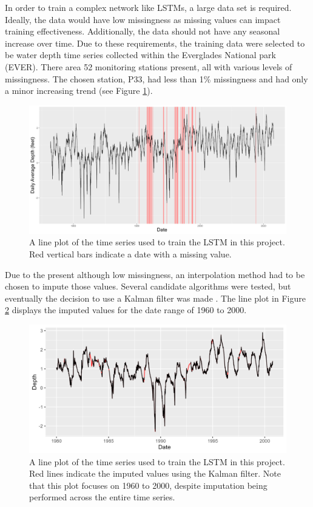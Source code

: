 In order to train a complex network like LSTMs, a large data set is required. Ideally, the data would have low missingness as missing values can impact training effectiveness. Additionally, the data should not have any seasonal increase over time. Due to these requirements, the training data were selected to be water depth time series collected within the Everglades National park (EVER). There area 52 monitoring stations present, all with various levels of missingness. The chosen station, P33, had less than 1\% missingness and had only a minor increasing trend (see Figure \ref{fig:P33}).

\begin{figure}[ht]
    \centering
    \includegraphics[width=0.75\linewidth]{"Figures/P33_Time_Series_Missingness.png"}
    \caption{A line plot of the time series used to train the LSTM in this project. Red vertical bars indicate a date with a missing value.}
    \label{fig:P33}
\end{figure}

Due to the present although low missingness, an interpolation method had to be chosen to impute those values. Several candidate algorithms were tested, but eventually the decision to use a Kalman filter was made \citep{kalmanfilter}. The line plot in Figure \ref{fig:P33_Interpolated} displays the imputed values for the date range of 1960 to 2000.

\begin{figure}[ht]
    \centering
    \includegraphics[width=0.75\linewidth]{"Figures/Interpolation_60_20.png"}
    \caption{A line plot of the time series used to train the LSTM in this project. Red lines indicate the imputed values using the Kalman filter. Note that this plot focuses on 1960 to 2000, despite imputation being performed across the entire time series.}
    \label{fig:P33_Interpolated}
\end{figure}